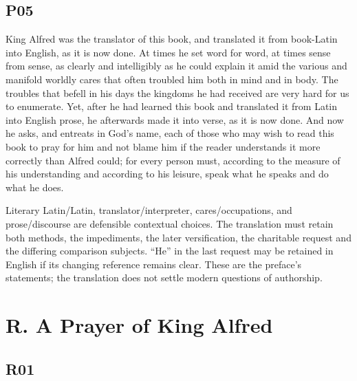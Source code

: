 \subsection*{P05}

\par\begin{minipage}{\linewidth}\raggedright
King Alfred was the translator of this book, and translated it from book-Latin into English, as it is now done. At times he set word for word, at times sense from sense, as clearly and intelligibly as he could explain it amid the various and manifold worldly cares that often troubled him both in mind and in body. The troubles that befell in his days the kingdoms he had received are very hard for us to enumerate. Yet, after he had learned this book and translated it from Latin into English prose, he afterwards made it into verse, as it is now done. And now he asks, and entreats in God’s name, each of those who may wish to read this book to pray for him and not blame him if the reader understands it more correctly than Alfred could; for every person must, according to the measure of his understanding and according to his leisure, speak what he speaks and do what he does.

Literary Latin/\allowbreak{}Latin, translator/\allowbreak{}interpreter, cares/\allowbreak{}occupations, and prose/\allowbreak{}discourse are defensible contextual choices. The translation must retain both methods, the impediments, the later versification, the charitable request and the differing comparison subjects. “He” in the last request may be retained in English if its changing reference remains clear. These are the preface’s statements; the translation does not settle modern questions of authorship.

\end{minipage}\par\addvspace{4pt}

\section*{R. A Prayer of King Alfred}

\subsection*{R01}

